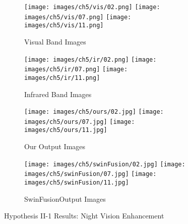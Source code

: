 \begin{figure}[htbp]
    \centering
    \begin{subfigure}[b]{\textwidth}
        \texttt{[image: images/ch5/vis/02.png]}
        \texttt{[image: images/ch5/vis/07.png]}
        \texttt{[image: images/ch5/vis/11.png]}
        \caption{Visual Band Images}
        \label{fig:ch5:met4:vis}
    \end{subfigure}
    \vspace{0.01cm}
    \begin{subfigure}[b]{\textwidth}
        \texttt{[image: images/ch5/ir/02.png]}
        \texttt{[image: images/ch5/ir/07.png]}
        \texttt{[image: images/ch5/ir/11.png]}
        \caption{Infrared Band Images}
        \label{fig:ch5:met4:ir}
    \end{subfigure}
    \vspace{0.01cm}
    \begin{subfigure}[b]{\textwidth}
        \texttt{[image: images/ch5/ours/02.jpg]}
        \texttt{[image: images/ch5/ours/07.jpg]}
        \texttt{[image: images/ch5/ours/11.jpg]}
        \caption{Our Output Images}
        \label{fig:ch5:met4:ours}
    \end{subfigure}
    \vspace{0.01cm}
    \begin{subfigure}[b]{\textwidth}
        \texttt{[image: images/ch5/swinFusion/02.jpg]}
        \texttt{[image: images/ch5/swinFusion/07.jpg]}
        \texttt{[image: images/ch5/swinFusion/11.jpg]}
        \caption{SwinFusion\cite{ma2022swinfusion}Output Images}
        \label{fig:ch5:met4:swin}
    \end{subfigure}
    \caption{Hypothesis II-1 Results: Night Vision Enhancement}
    \label{fig:ch5:met4}
\end{figure}

